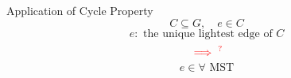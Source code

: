 \begin{frame}{}
  \begin{exampleblock}{Application of Cycle Property}
    \[
      C \subseteq G, \quad e \in C
    \]
    \[
      e: \text{ the unique lightest edge of } C
    \]
    \[
      \textcolor{red}{\implies^{?}}
    \]
    \[
      e \in \forall \text{ MST}
    \]
  \end{exampleblock}

  \pause
  \vspace{0.50cm}
\end{frame}
